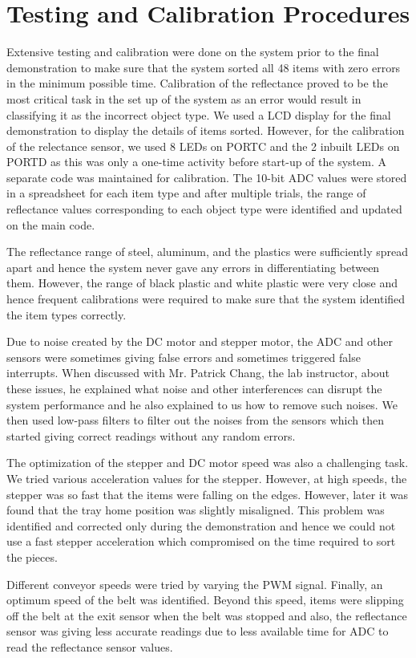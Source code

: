 \section{Testing and Calibration Procedures}\label{sec:testingcalibration}
Extensive testing and calibration were done on the system prior to the final demonstration to make sure that the system sorted all 48 items with zero errors in the minimum possible time. Calibration of the reflectance proved to be the most critical task in the set up of the system as an error would result in classifying it as the incorrect object type. We used a LCD display for the final demonstration to display the details of items sorted. However, for the calibration of the relectance sensor, we used 8 LEDs on PORTC and the 2 inbuilt LEDs on PORTD as this was only a one-time activity before start-up of the system. A separate code was maintained for calibration. The 10-bit ADC values were stored in a spreadsheet for each item type and after multiple trials, the range of reflectance values corresponding to each object type were identified and updated on the main code.

The reflectance range of steel, aluminum, and the plastics were sufficiently spread apart and hence the system never gave any errors in differentiating between them. However, the range of black plastic and white plastic were very close and hence frequent calibrations were required to make sure that the system identified the item types correctly.

Due to noise created by the DC motor and stepper motor, the ADC and other sensors were sometimes giving false errors and sometimes triggered false interrupts. When discussed with Mr. Patrick Chang, the lab instructor, about these issues, he explained what noise and other interferences can disrupt the system performance and he also explained to us how to remove such noises. We then used low-pass filters to filter out the noises from the sensors which then started giving correct readings without any random errors.

The optimization of the stepper and DC motor speed was also a challenging task. We tried various acceleration values for the stepper. However, at high speeds, the stepper was so fast that the items were falling on the edges. However, later it was found that the tray home position was slightly misaligned. This problem was identified and corrected only during the demonstration and hence we could not use a fast stepper acceleration which compromised on the time required to sort the pieces.

Different conveyor speeds were tried by varying the PWM signal. Finally, an optimum speed of the belt was identified. Beyond this speed, items were slipping off the belt at the exit sensor when the belt was stopped and also, the reflectance sensor was giving less accurate readings due to less available time for ADC to read the reflectance sensor values.
